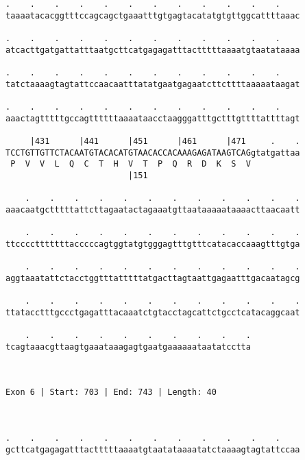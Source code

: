 \documentclass{article}
\begin{document}
\begin{Verbatim}
.    .    .    .    .    .    .    .    .    .    .    .    
taaaatacacggtttccagcagctgaaatttgtgagtacatatgtgttggcattttaaac
                                                            
.    .    .    .    .    .    .    .    .    .    .    .    
atcacttgatgattatttaatgcttcatgagagatttactttttaaaatgtaatataaaa
                                                            
.    .    .    .    .    .    .    .    .    .    .    .    
tatctaaaagtagtattccaacaatttatatgaatgagaatcttcttttaaaaataagat
                                                            
.    .    .    .    .    .    .    .    .    .    .    .    
aaactagtttttgccagttttttaaaataacctaagggatttgctttgttttattttagt
                                                            
     |431      |441      |451      |461      |471     .    .
TCCTGTTGTTCTACAATGTACACATGTAACACCACAAAGAGATAAGTCAGgtatgattaa
 P  V  V  L  Q  C  T  H  V  T  P  Q  R  D  K  S  V          
                         |151                               
  
    .    .    .    .    .    .    .    .    .    .    .    .
aaacaatgctttttattcttagaatactagaaatgttaataaaaataaaacttaacaatt
                                                            
    .    .    .    .    .    .    .    .    .    .    .    .
ttcccctttttttacccccagtggtatgtgggagtttgtttcatacaccaaagtttgtga
                                                            
    .    .    .    .    .    .    .    .    .    .    .    .
aggtaaatattctacctggtttatttttatgacttagtaattgagaatttgacaatagcg
                                                            
    .    .    .    .    .    .    .    .    .    .    .    .
ttatacctttgccctgagatttacaaatctgtacctagcattctgcctcatacaggcaat
                                                            
    .    .    .    .    .    .    .    .    .    .
tcagtaaacgttaagtgaaataaagagtgaatgaaaaaataatatcctta
                                                  
                                                  
 
Exon 6 | Start: 703 | End: 743 | Length: 40



.    .    .    .    .    .    .    .    .    .    .    .    
gcttcatgagagatttactttttaaaatgtaatataaaatatctaaaagtagtattccaa
                                                            

\end{Verbatim}
\end{document}
